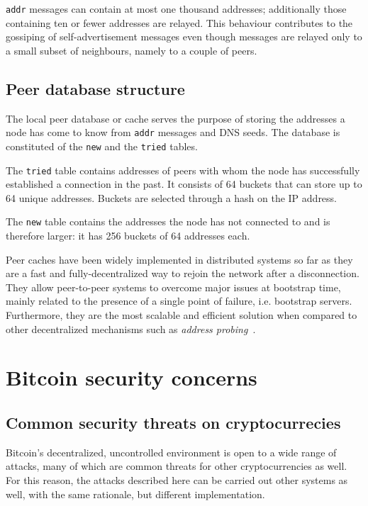 \documentclass[12pt, letterpaper, twoside]{article}
\begin{document}
\texttt{addr} messages can contain at most one thousand addresses; additionally those containing ten or fewer addresses are relayed. This behaviour contributes to the gossiping of self-advertisement messages even though messages are relayed only to a small subset of neighbours, namely to a couple of peers.

\subsection{Peer database structure}\label{sec:cachestruct}
The local peer database or cache serves the purpose of storing the addresses a node has come to know from \texttt{addr} messages and DNS seeds. The database is constituted of the \texttt{new} and the \texttt{tried} tables.

The \texttt{tried} table contains addresses of peers with whom the node has successfully established a connection in the past. It consists of 64 buckets that can store up to 64 unique addresses. Buckets are selected through a hash on the IP address.

The \texttt{new} table contains the addresses the node has not connected to and is therefore larger: it has 256 buckets of 64 addresses each.

Peer caches have been widely implemented in distributed systems so far as they are a fast and fully-decentralized way to rejoin the network after a disconnection. They allow peer-to-peer systems to overcome major issues at bootstrap time, mainly related to the presence of a single point of failure, i.e. bootstrap servers. Furthermore, they are the most scalable and efficient solution when compared to other decentralized mechanisms such as \textit{address probing}~\cite{decentrbootstrapp2p}.

\section{Bitcoin security concerns}\label{sec:securityintro}
\subsection{Common security threats on cryptocurrecies}
Bitcoin's decentralized, uncontrolled environment is open to a wide range of attacks, many of which are common threats for other cryptocurrencies as well. For this reason, the attacks described here can be carried out other systems as well, with the same rationale, but different implementation.\\
\end{document}

